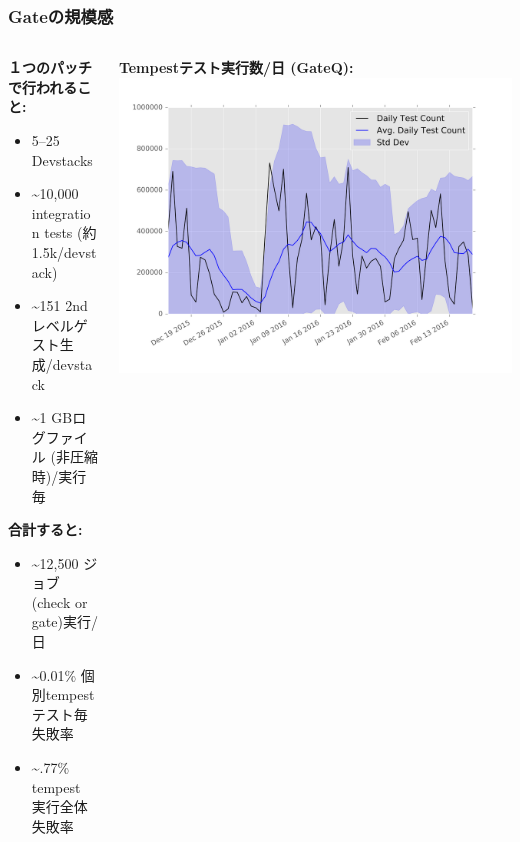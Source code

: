\documentclass[aspectratio=169,11pt,hyperref={colorlinks=true}]{beamer}
\begin{document}
\begin{frame}
\frametitle{Gateの規模感}
  \begin{columns}[T]
    \begin{column}{.50\textwidth}
      \textbf{１つのパッチで行われること:}
      \begin{itemize}
        \item 5--25 Devstacks
        \item \textasciitilde10,000 integration tests (約1.5k/devstack)
        \item \textasciitilde151 2ndレベルゲスト生成/devstack
        \item \textasciitilde1 GBログファイル (非圧縮時)/実行毎
      \end{itemize}
      \textbf{合計すると:}
      \begin{itemize}
        \item \textasciitilde12,500 ジョブ (check or gate)実行/日
        \item \textasciitilde0.01\% 個別tempestテスト毎 失敗率
        \item \textasciitilde.77\% tempest 実行全体 失敗率
      \end{itemize}
    \end{column}
    \begin{column}{.48\textwidth}
        \centering
        \textbf{Tempestテスト実行数/日 (GateQ):}
        \includegraphics[width=1.22\textwidth]{tempest-gate-count.png}
    \end{column}
  \end{columns}
\end{frame}
\end{document}
